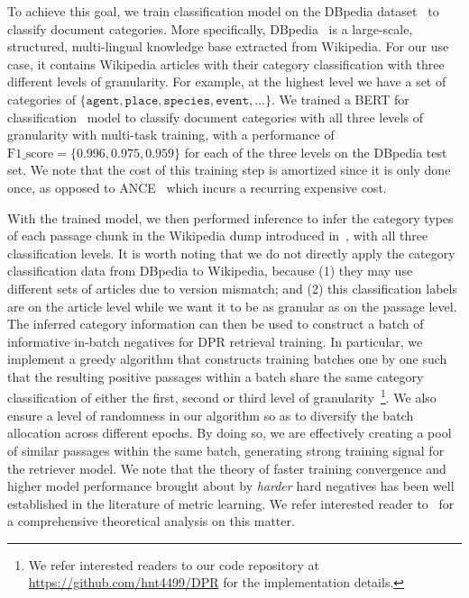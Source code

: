 To achieve this goal, we train classification model on the DBpedia dataset~\cite{lehmann2015dbpedia} to classify document categories.
%
More specifically, DBpedia~\cite{lehmann2015dbpedia} is a large-scale, structured, multi-lingual knowledge base extracted from Wikipedia.
%
For our use case, it contains Wikipedia articles with their category classification with three different levels of granularity.
%
For example, at the highest level we have a set of categories of $\{\texttt{agent}, \texttt{place}, \texttt{species}, \texttt{event}, \ldots\}$.
%
We trained a BERT for classification~\cite{wolf2019huggingface} model to classify document categories with all three levels of granularity with multi-task training, with a performance of $\text{F1\_score} = \{0.996, 0.975, 0.959\}$ for each of the three levels on the DBpedia test set.
%
We note that the cost of this training step is amortized since it is only done once, as opposed to ANCE~\cite{xiong2020approximate} which incurs a recurring expensive cost.

With the trained model, we then performed inference to infer the category types of each passage chunk in the Wikipedia dump introduced in~, with all three classification levels.
%
It is worth noting that we do not directly apply the category classification data from DBpedia to Wikipedia, because (1) they may use different sets of articles due to version mismatch; and (2) this classification labels are on the article level while we want it to be as granular as on the passage level.
%
The inferred category information can then be used to construct a batch of informative in-batch negatives for DPR retrieval training.
%
In particular, we implement a greedy algorithm that constructs training batches one by one such that the resulting positive passages within a batch share the same category classification of either the first, second or third level of granularity~\footnote{We refer interested readers to our code repository at \url{https://github.com/hnt4499/DPR} for the implementation details.}.
%
We also ensure a level of randomness in our algorithm so as to diversify the batch allocation across different epochs.
%
By doing so, we are effectively creating a pool of similar passages within the same batch, generating strong training signal for the retriever model.
%
We note that the theory of faster training convergence and higher model performance brought about by \emph{harder} hard negatives has been well established in the literature of metric learning.
%
We refer interested reader to~\citet{xiong2020approximate} for a comprehensive theoretical analysis on this matter.


